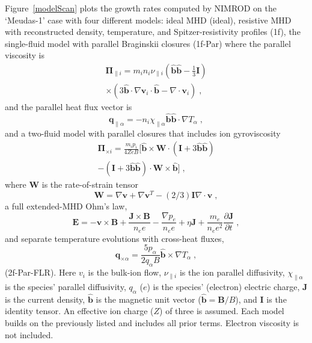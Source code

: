 Figure~\ref{modelScan} plots the growth rates computed by NIMROD on the
`Meudas-1' case with four different models: ideal MHD (ideal), resistive MHD with
reconstructed density, temperature, and Spitzer-resistivity profiles (1f), the
single-fluid model with parallel Braginskii closures (1f-Par) where the 
parallel viscosity is
\begin{multline}
\mathbf{\Pi}_{\parallel i}=
  m_i n_i \nu_{\parallel i}
  \left(\hat{\mathbf{b}}
  \hat{\mathbf{b}}-\frac{1}{3}\mathbf{I}\right) \\
  \times\left(3\hat{\mathbf{b}}\cdot\nabla\mathbf{v}_{i}\cdot
  \hat{\mathbf{b}}-\nabla\cdot\mathbf{v}_{i}\right)\;,
\end{multline}
and the parallel heat flux vector is
\begin{equation}
\mathbf{q}_{\parallel \alpha}=
  -n_i \chi_{\parallel \alpha}
  \hat{\mathbf{b}}\hat{\mathbf{b}}\cdot\nabla T_{\alpha}\;,
\end{equation}
and a two-fluid model with parallel closures that includes ion gyroviscosity
\begin{multline}
\mathbf{\Pi}_{\times i}=
  \frac{m_{i}p_{i}}{4ZeB}[\hat{\mathbf{b}}
    \times\mathbf{W}\cdot
    \left(\mathbf{I}+3\hat{\mathbf{b}}\hat{\mathbf{b}}\right) \\
    -\left(\mathbf{I}+3\hat{\mathbf{b}}\hat{\mathbf{b}}\right)
    \cdot\mathbf{W}\times\hat{\mathbf{b}}]\;,
\end{multline}
where $\mathbf{W}$ is the rate-of-strain tensor
\begin{equation}
\mathbf{W}=\nabla\mathbf{v}+\nabla\mathbf{v}^{T}
           -(2/3)\mathbf{I}\nabla\cdot\mathbf{v}\;,
\end{equation}
a full extended-MHD Ohm's law,
\begin{equation}
\mathbf{E}=
  -\mathbf{v}\times\mathbf{B}+\frac{\mathbf{J}\times\mathbf{B}}{n_ee}
  -\frac{\nabla p_{e}}{n_ee}+\eta\mathbf{J}
  +\frac{m_{e}}{n_e e^2}\frac{\partial\mathbf{J}}{\partial t}\;,
\end{equation}
and separate temperature evolutions with cross-heat fluxes,
\begin{equation}
\mathbf{q}_{\times \alpha}=
  \frac{5p_{\alpha}}{2q_{\alpha}B}
  \hat{\mathbf{b}}\times\nabla T_{\alpha}\;,
\end{equation}
(2f-Par-FLR). Here $v_i$ is the bulk-ion flow, $\nu_{\parallel i}$ is the ion parallel
diffusivity, $\chi_{\parallel \alpha}$ is the species' parallel diffusivity,
$q_\alpha$ ($e$) is the species' (electron) electric charge,  $\mathbf{J}$ is
the current density, $\hat{\mathbf{b}}$ is the magnetic unit vector
($\hat{\mathbf{b}} = \mathbf{B}/B$), and $\mathbf{I}$ is the identity tensor.
An effective ion charge ($Z$) of three is assumed. Each model builds
on the previously listed and includes all prior terms. Electron viscosity is
not included.


